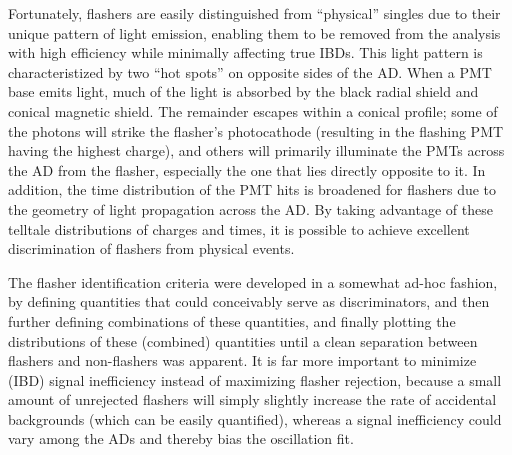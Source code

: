 \documentclass[../thesis.tex]{subfiles}
\begin{document}
Fortunately, flashers are easily distinguished from ``physical'' singles due to their unique pattern of light emission, enabling them to be removed from the analysis with high efficiency while minimally affecting true IBDs. This light pattern is characteristized by two ``hot spots'' on opposite sides of the AD. When a PMT base emits light, much of the light is absorbed by the black radial shield and conical magnetic shield. The remainder escapes within a conical profile; some of the photons will strike the flasher's photocathode (resulting in the flashing PMT having the highest charge), and others will primarily illuminate the PMTs across the AD from the flasher, especially the one that lies directly opposite to it. In addition, the time distribution of the PMT hits is broadened for flashers due to the geometry of light propagation across the AD. By taking advantage of these telltale distributions of charges and times, it is possible to achieve excellent discrimination of flashers from physical events.

The flasher identification criteria were developed in a somewhat ad-hoc fashion, by defining quantities that could conceivably serve as discriminators, and then further defining combinations of these quantities, and finally plotting the distributions of these (combined) quantities until a clean separation between flashers and non-flashers was apparent. It is far more important to minimize (IBD) signal inefficiency instead of maximizing flasher rejection, because a small amount of unrejected flashers will simply slightly increase the rate of accidental backgrounds (which can be easily quantified), whereas a signal inefficiency could vary among the ADs and thereby bias the oscillation fit.

\newcommand\fmax{f_{\mathrm{max}}}
\newcommand\fquad{f_{\mathrm{quad}}}
\newcommand\fID{f_{\mathrm{ID}}}
\newcommand\fPSD{f_{\mathrm{PSD}}}
\end{document}
